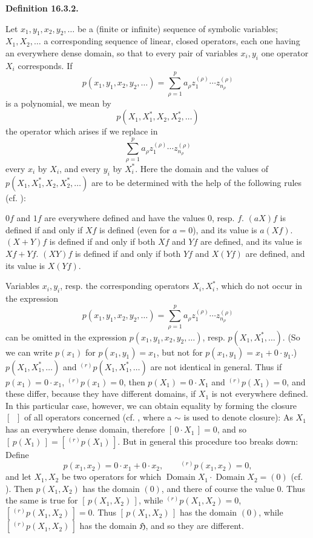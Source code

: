 \documentclass[12pt,b5paper,twoside]{article}
\newcommand{\Hspace}{\mathfrak H}
\newcommand{\clos}[1]{[\,#1\,]}
\newcommand{\Definition}[1]{%
  \par\smallskip\noindent\phantomsection\label{def:#1}\textbf{Definition #1.}\enspace
}
\begin{document}
\Definition{16.3.2}
Let \(x_1,y_1,x_2,y_2,\ldots\) be a (finite or infinite) sequence of
symbolic variables; \(X_1,X_2,\ldots\) a corresponding sequence of linear,
closed operators, each one having an everywhere dense domain, so that to
every pair of variables \(x_i,y_i\) one operator \(X_i\) corresponds. If
\[
p(x_1,y_1,x_2,y_2,\ldots)
=\sum_{\rho=1}^{p}a_\rho
 z_1^{(\rho)}\cdots z_{n_\rho}^{(\rho)}
\]
is a polynomial, we mean by
\[
p(X_1,X_1^*,X_2,X_2^*,\ldots)
\]
the operator which arises if we replace in
\[
\sum_{\rho=1}^{p}a_\rho
z_1^{(\rho)}\cdots z_{n_\rho}^{(\rho)}
\]
every \(x_i\) by \(X_i\), and every \(y_i\) by \(X_i^*\). Here the domain
and the values of
\(p(X_1,X_1^*,\allowbreak X_2,X_2^*,\ldots)\) are to be determined with the help of the
following rules (cf. \cite[p.~404]{ref18}):

\(0f\) and \(1f\) are everywhere defined and have the values \(0\), resp.
\(f\). \((aX)f\) is defined if and only if \(Xf\) is defined (even for
\(a=0\)), and its value is \(a(Xf)\). \((X+Y)f\) is defined if and only if
both \(Xf\) and \(Yf\) are defined, and its value is \(Xf+Yf\). \((XY)f\)
is defined if and only if both \(Yf\) and \(X(Yf)\) are defined, and its
value is \(X(Yf)\).

Variables \(x_i,y_i\), resp. the corresponding operators \(X_i,X_i^*\),
which do not occur in the expression
\[
p(x_1,y_1,x_2,y_2,\ldots)
=\sum_{\rho=1}^{p}a_\rho
z_1^{(\rho)}\cdots z_{n_\rho}^{(\rho)}
\]
can be omitted in the expression \(p(x_1,y_1,x_2,y_2,\ldots)\), resp.
\(p(X_1,X_1^*,\ldots)\). (So we can write \(p(x_1)\) for
\(p(x_1,y_1)=x_1\), but not for \(p(x_1,y_1)=x_1+0\cdot y_1\).)
\(p(X_1,X_1^*,\ldots)\) and
\({}^{(r)}p(X_1,X_1^*,\ldots)\) are not identical in general. Thus if
\(p(x_1)=0\cdot x_1\), \({}^{(r)}p(x_1)=0\), then
\(p(X_1)=0\cdot X_1\) and \({}^{(r)}p(X_1)=0\), and these differ, because
they have different domains, if \(X_1\) is not everywhere defined. In this
particular case, however, we can obtain equality by forming the closure
\(\clos{\ }\) of all operators concerned (cf. \cite[pp.~70--71]{ref16},
where a \(\sim\) is used to denote closure): As \(X_1\) has an everywhere
dense domain, therefore \(\clos{0\cdot X_1}=0\), and so
\(\clos{p(X_1)}=\clos{{}^{(r)}p(X_1)}\). But in general this procedure too
breaks down: Define
\[
p(x_1,x_2)=0\cdot x_1+0\cdot x_2,
\qquad{}^{(r)}p(x_1,x_2)=0,
\]
and let \(X_1,X_2\) be two operators for which
\(\operatorname{Domain}X_1\cdot\operatorname{Domain}X_2=(0)\)
(cf. \cite[p.~230]{ref17}). Then \(p(X_1,X_2)\) has the domain \((0)\), and
there of course the value \(0\). Thus the same is true for
\(\clos{p(X_1,X_2)}\), while \({}^{(r)}p(X_1,X_2)=0\),
\(\clos{{}^{(r)}p(X_1,X_2)}=0\). Thus \(\clos{p(X_1,X_2)}\) has the domain
\((0)\), while \(\clos{{}^{(r)}p(X_1,X_2)}\) has the domain \(\Hspace\), and
so they are different.
\end{document}
